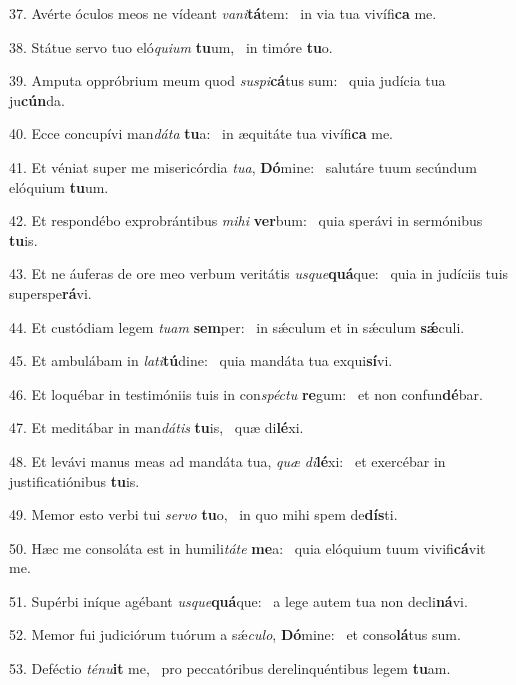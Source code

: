 37. Avérte óculos meos ne vídeant \textit{va}\textit{ni}\textbf{tá}tem: \ast\  in via tua vivífi\textbf{ca} me.\

38. Státue servo tuo eló\textit{qui}\textit{um} \textbf{tu}um, \ast\  in timóre \textbf{tu}o.\

39. Amputa oppróbrium meum quod \textit{su}\textit{spi}\textbf{cá}tus sum: \ast\  quia judícia tua ju\textbf{cún}da.\

40. Ecce concupívi man\textit{dá}\textit{ta} \textbf{tu}a: \ast\  in æquitáte tua vivífi\textbf{ca} me.\

41. Et véniat super me misericórdia \textit{tu}\textit{a}, \textbf{Dó}mine: \ast\  salutáre tuum secúndum elóquium \textbf{tu}um.\

42. Et respondébo exprobrántibus \textit{mi}\textit{hi} \textbf{ver}bum: \ast\  quia sperávi in sermónibus \textbf{tu}is.\

43. Et ne áuferas de ore meo verbum veritátis \textit{us}\textit{que}\textbf{quá}que: \ast\  quia in judíciis tuis superspe\textbf{rá}vi.\

44. Et custódiam legem \textit{tu}\textit{am} \textbf{sem}per: \ast\  in sǽculum et in sǽculum \textbf{sǽ}culi.\

45. Et ambulábam in \textit{la}\textit{ti}\textbf{tú}dine: \ast\  quia mandáta tua exqui\textbf{sí}vi.\

46. Et loquébar in testimóniis tuis in con\textit{spéc}\textit{tu} \textbf{re}gum: \ast\  et non confun\textbf{dé}bar.\

47. Et meditábar in man\textit{dá}\textit{tis} \textbf{tu}is, \ast\  quæ di\textbf{lé}xi.\

48. Et levávi manus meas ad mandáta tua, \textit{quæ} \textit{di}\textbf{lé}xi: \ast\  et exercébar in justificatiónibus \textbf{tu}is.\

49. Memor esto verbi tui \textit{ser}\textit{vo} \textbf{tu}o, \ast\  in quo mihi spem de\textbf{dís}ti.\

50. Hæc me consoláta est in humili\textit{tá}\textit{te} \textbf{me}a: \ast\  quia elóquium tuum vivifi\textbf{cá}vit me.\

51. Supérbi iníque agébant \textit{us}\textit{que}\textbf{quá}que: \ast\  a lege autem tua non decli\textbf{ná}vi.\

52. Memor fui judiciórum tuórum a sǽ\textit{cu}\textit{lo}, \textbf{Dó}mine: \ast\  et conso\textbf{lá}tus sum.\

53. Deféctio \textit{té}\textit{nu}\textbf{it} me, \ast\  pro peccatóribus derelinquéntibus legem \textbf{tu}am.\

